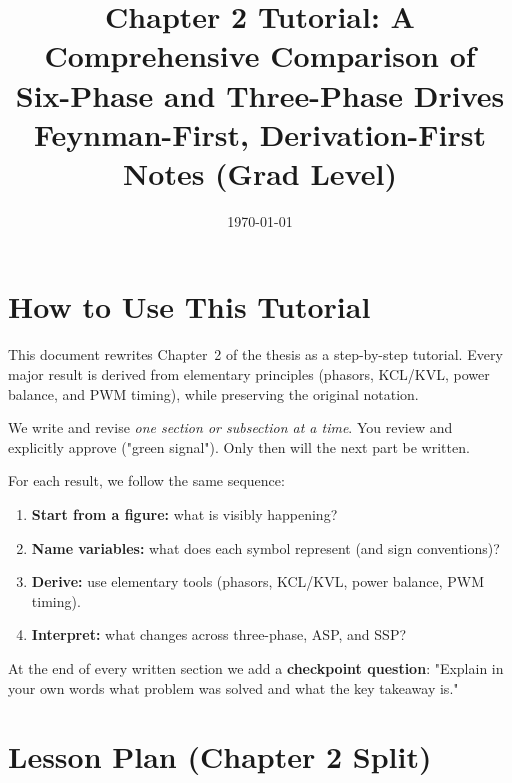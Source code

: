 \documentclass[12pt, a4paper]{article}
\title{\textbf{Chapter 2 Tutorial: A Comprehensive Comparison of}\\[2pt]
       \textbf{Six-Phase and Three-Phase Drives}\\[6pt]
       \large Feynman-First, Derivation-First Notes (Grad Level)}
\author{}
\date{\today}
\begin{document}
\maketitle
\tableofcontents
\clearpage

\section{How to Use This Tutorial}
\label{sec:how_to_use}

This document rewrites Chapter~2 of the thesis as a step-by-step tutorial.
Every major result is derived from elementary principles (phasors, KCL/KVL,
power balance, and PWM timing), while preserving the original notation.

\begin{warningbox}
We write and revise \emph{one section or subsection at a time}.
You review and explicitly approve ("green signal"). Only then will the next part
be written.
\end{warningbox}

\begin{statebox}
For each result, we follow the same sequence:
\begin{enumerate}
    \item \textbf{Start from a figure:} what is visibly happening?
    \item \textbf{Name variables:} what does each symbol represent (and sign conventions)?
    \item \textbf{Derive:} use elementary tools (phasors, KCL/KVL, power balance, PWM timing).
    \item \textbf{Interpret:} what changes across three-phase, ASP, and SSP?
\end{enumerate}
At the end of every written section we add a \textbf{checkpoint question}:
"Explain in your own words what problem was solved and what the key takeaway is."
\end{statebox}

\clearpage

\section{Lesson Plan (Chapter 2 Split)}
\label{sec:lesson_plan}
\end{document}
